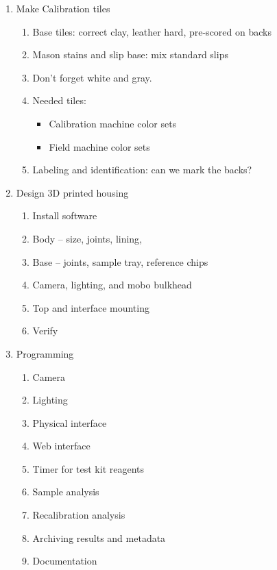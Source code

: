 \documentclass{article}
\begin{document}
\begin{enumerate}[label=\arabic*.]
\item Make Calibration tiles
\begin{enumerate}[label=\alph*)]
    \item Base tiles: correct clay, leather hard, pre-scored on backs
    \item Mason stains and slip base: mix standard slips
    \item Don't forget white and gray.
    \item Needed tiles:
    \begin{itemize}
        \item Calibration machine color sets
        \item Field machine color sets
    \end{itemize}
    \item Labeling and identification: can we mark the backs?
\end{enumerate}

\item Design 3D printed housing
\begin{enumerate}[label=\alph*)]
    \item Install software
    \item Body -- size, joints, lining,
    \item Base -- joints, sample tray, reference chips
    \item Camera, lighting, and mobo bulkhead
    \item Top and interface mounting
    \item Verify
\end{enumerate}

\item Programming
\begin{enumerate}[label=\alph*)]
    \item Camera
    \item Lighting
    \item Physical interface
    \item Web interface
    \item Timer for test kit reagents
    \item Sample analysis
    \item Recalibration analysis
    \item Archiving results and metadata
    \item Documentation
\end{enumerate}

\end{enumerate}
\end{document}
